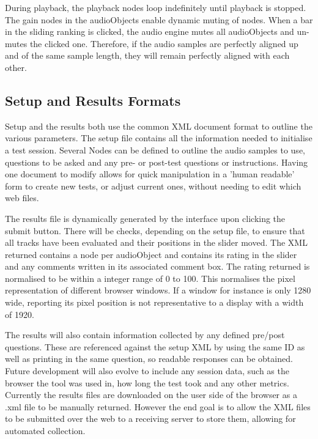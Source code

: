 \documentclass{article}
\begin{document}
During playback, the playback nodes loop indefinitely until playback is stopped. The gain nodes in the audioObjects enable dynamic muting of nodes. When a bar in the sliding ranking is clicked, the audio engine mutes all audioObjects and un-mutes the clicked one. Therefore, if the audio samples are perfectly aligned up and of the same sample length, they will remain perfectly aligned with each other.

\subsection{Setup and Results Formats}\label{sec:setupresultsformats}

Setup and the results both use the common XML document format to outline the various parameters. The setup file contains all the information needed to initialise a test session. Several Nodes can be defined to outline the audio samples to use, questions to be asked and any pre- or post-test questions or instructions. Having one document to modify allows for quick manipulation in a 'human readable' form to create new tests, or adjust current ones, without needing to edit which web files.

The results file is dynamically generated by the interface upon clicking the submit button. There will be checks, depending on the setup file, to ensure that all tracks have been evaluated and their positions in the slider moved. The XML returned contains a node per audioObject and contains its rating in the slider and any comments written in its associated comment box. The rating returned is normalised to be within a integer range of 0 to 100. This normalises the pixel representation of different browser windows. If a window for instance is only 1280 wide, reporting its pixel position is not representative to a display with a width of 1920.

The results will also contain information collected by any defined pre/post questions. These are referenced against the setup XML by using the same ID as well as printing in the same question, so readable responses can be obtained. Future development will also evolve to include any session data, such as the browser the tool was used in, how long the test took and any other metrics. Currently the results files are downloaded on the user side of the browser as a .xml file to be manually returned. However the end goal is to allow the XML files to be submitted over the web to a receiving server to store them, allowing for automated collection.
\end{document}
